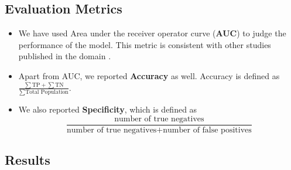 \documentclass[11pt,a4paper]{article}
\begin{document}
\subsection{Evaluation Metrics}\label{metric}

\begin{itemize}
	\item We have used Area under the receiver operator curve (\textbf{AUC}) to judge the performance of the model. This metric is consistent with  other studies published in the domain \cite{DudaHart2nd}. \item Apart from AUC, we reported \textbf{Accuracy} as well. Accuracy is defined as $\displaystyle \frac{\sum \textrm{TP} + \sum \textrm{TN}}{\sum \textrm{Total~Population}}$. \item We also reported \textbf{Specificity}, which is defined as $${\displaystyle {{\frac {\textrm{number of true negatives}}{{\textrm{number of true negatives}}+{\textrm{number of false positives}}}}}}$$
\end{itemize}
\subsection{Results}\label{res}
\end{document}
